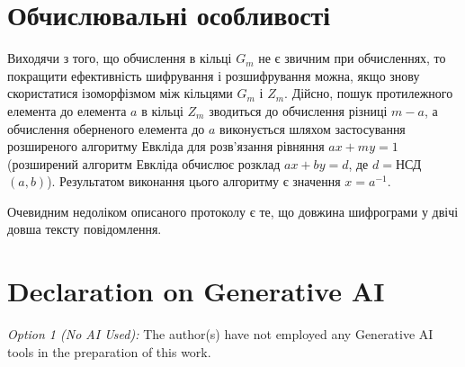 \documentclass{ceurart}
\begin{document}
\section{Обчислювальні особливості}
Виходячи з того, що обчислення в кільці \(G_m\) не є
звичним при обчисленнях, то покращити ефективність шифрування
і розшифрування можна, якщо знову скористатися ізоморфізмом
між кільцями \(G_m\) і \(Z_m\). Дійсно, пошук протилежного елемента
до елемента \(a\) в кільці \(Z_m\) зводиться до обчислення різниці
\(m-a\), а обчислення оберненого елемента до \(a\) виконується
шляхом застосування розширеного алгоритму Евкліда для розв'язання
рівняння \(ax + my = 1\) (розширений алгоритм Евкліда обчислює розклад
\(ax+by=d\), де \(d=\)НСД\((a,b)\)). Результатом виконання цього
алгоритму є значення \(x=a^{-1}\).

Очевидним недоліком описаного протоколу є те, що довжина шифрограми
у двічі довша тексту повідомлення.



\section*{Declaration on Generative AI}
  {\em Option 1 (No AI Used):}\newline
  The author(s) have not employed any Generative AI tools in the preparation of this work.
  \newline

\end{document}
